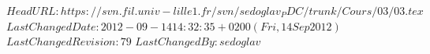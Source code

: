 \svnidlong 
{$HeadURL: https://svn.fil.univ-lille1.fr/svn/sedoglav_PDC/trunk/Cours/03/03.tex $} 
{$LastChangedDate: 2012-09-14 14:32:35 +0200 (Fri, 14 Sep 2012) $} 
{$LastChangedRevision: 79 $} 
{$LastChangedBy: sedoglav $} 
